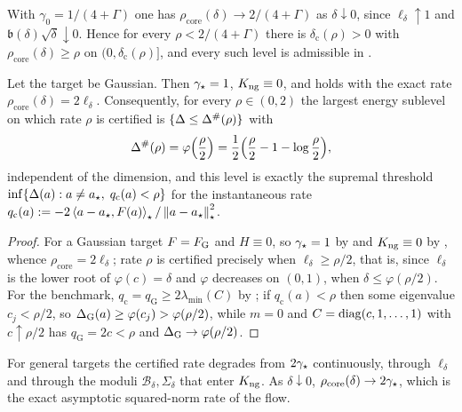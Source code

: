 \begin{corollary}
\label{cor:loc-universal}
With $\gamma_0=1/(4+\Gamma)$ one has $\rho_{\mathrm{core}}(\delta)\to2/(4+\Gamma)$ as
$\delta\downarrow0$, since $\ell_\delta\uparrow1$ and $\mathfrak b(\delta)\sqrt\delta\downarrow0$.
Hence for every $\rho<2/(4+\Gamma)$ there is $\delta_{\mathrm c}(\rho)>0$ with
$\rho_{\mathrm{core}}(\delta)\geq\rho$ on $(0,\delta_{\mathrm c}(\rho)]$, and every such level
is admissible in .
\end{corollary}

\begin{corollary}
\label{cor:loc-Gauss}
Let the target be Gaussian. Then $\gamma_\star=1$, $K_{\mathrm{ng}}\equiv0$, and  holds with
the exact rate $\rho_{\mathrm{core}}(\delta)=2\ell_\delta$. Consequently, for every
$\rho\in(0,2)$ the largest energy sublevel on which rate $\rho$ is certified is
$\{\Delta\leq\Delta^{\#}(\rho)\}$ with
\begin{equation}
\label{eq:gauss-sharp-thresh}
    \Delta^{\#}(\rho)=\varphi\Bigl(\frac\rho2\Bigr)=\frac12\Bigl(\frac\rho2-1-\log\frac\rho2\Bigr),
\end{equation}
independent of the dimension, and this level is exactly the supremal threshold
$\inf\{\Delta(a):a\neq a_\star,\;q_{\mathrm c}(a)<\rho\}$ for the instantaneous rate
$q_{\mathrm c}(a):=-2\left\langle a-a_\star,F(a)\right\rangle_\star/\left\lVert a-a_\star\right\rVert_\star^2$.
\end{corollary}

\begin{proof}
For a Gaussian target $F=F_{\mathrm G}$ and $H\equiv0$, so $\gamma_\star=1$ by
 and $K_{\mathrm{ng}}\equiv0$ by , whence
$\rho_{\mathrm{core}}=2\ell_\delta$; rate $\rho$ is certified precisely when
$\ell_\delta\geq\rho/2$, that is, since $\ell_\delta$ is the lower root of $\varphi(c)=\delta$
and $\varphi$ decreases on $(0,1)$, when $\delta\leq\varphi(\rho/2)$. For the benchmark,
$q_{\mathrm c}=q_{\mathrm G}\geq2\lambda_{\min}(C)$ by ; if
$q_{\mathrm c}(a)<\rho$ then some eigenvalue $c_j<\rho/2$, so
$\Delta_{\mathrm G}(a)\geq\varphi(c_j)>\varphi(\rho/2)$, while $m=0$ and
$C=\operatorname{diag}(c,1,\dots,1)$ with $c\uparrow\rho/2$ has $q_{\mathrm G}=2c<\rho$ and
$\Delta_{\mathrm G}\to\varphi(\rho/2)$.
\end{proof}

For general targets the certified rate degrades from $2\gamma_\star$ continuously, through
$\ell_\delta$ and through the moduli $\mathcal B_\delta,\Sigma_\delta$ that enter $K_{\mathrm{ng}}$. As
$\delta\downarrow0$, $\rho_{\mathrm{core}}(\delta)\to2\gamma_\star$, which is the exact asymptotic
squared-norm rate of the flow.

